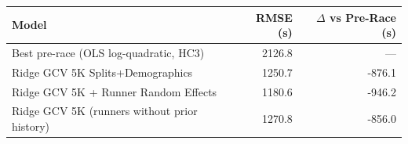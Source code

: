 \begin{tabular}{lrr}
\hline
Model & RMSE (s) & $\Delta$ vs Pre-Race (s) \\
\hline
Best pre-race (OLS log-quadratic, HC3) & 2126.8 & --- \\
Ridge GCV 5K Splits+Demographics & 1250.7 & -876.1 \\
Ridge GCV 5K + Runner Random Effects & 1180.6 & -946.2 \\
Ridge GCV 5K (runners without prior history) & 1270.8 & -856.0 \\
\hline
\end{tabular}
